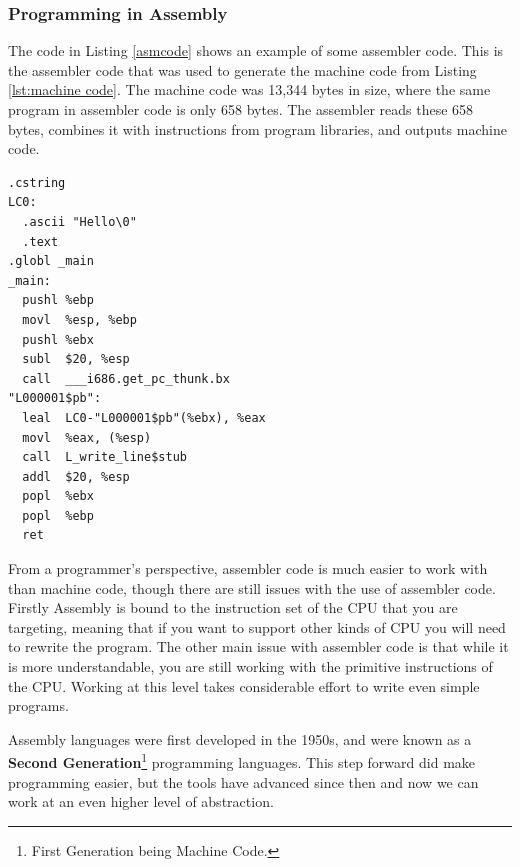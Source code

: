 \clearpage
\subsubsection{Programming in Assembly} %
\label{ssub:programming_in_assembly}

The code in Listing \vref{asmcode} shows an example of some assembler code. This is the assembler code that was used to generate the machine code from Listing \ref{lst:machine code}. The machine code was 13,344 bytes in size, where the same program in assembler code is only 658 bytes. The assembler reads these 658 bytes, combines it with instructions from program libraries, and outputs machine code. 

\begin{lstlisting}[caption={Assembler Sample},label={asmcode}]
  .cstring
LC0:
  .ascii "Hello\0"
  .text
.globl _main
_main:
  pushl	%ebp
  movl	%esp, %ebp
  pushl	%ebx
  subl	$20, %esp
  call	___i686.get_pc_thunk.bx 
"L000001$pb":
  leal	LC0-"L000001$pb"(%ebx), %eax
  movl	%eax, (%esp)
  call	L_write_line$stub
  addl	$20, %esp
  popl	%ebx
  popl	%ebp
  ret
\end{lstlisting}

From a programmer's perspective, assembler code is much easier to work with than machine code, though there are still issues with the use of assembler code. Firstly Assembly is bound to the instruction set of the CPU that you are targeting, meaning that if you want to support other kinds of CPU you will need to rewrite the program. The other main issue with assembler code is that while it is more understandable, you are still working with the primitive instructions of the CPU. Working at this level takes considerable effort to write even simple programs.

Assembly languages were first developed in the 1950s, and were known as a \textbf{Second Generation}\footnote{First Generation being Machine Code.} programming languages. This step forward did make programming easier, but the tools have advanced since then and now we can work at an even higher level of abstraction.



